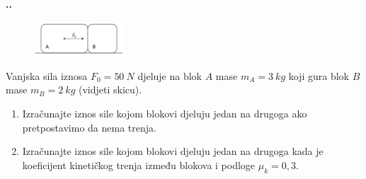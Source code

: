 

\noindent 
\textbf{
\thecjelina.\thezadatak.}
\begin{figure} %
    \centering
    \includegraphics[width=0.3\textwidth]{03_Dinamika_materijalne_tocke/zadatak_D310.png}
\end{figure}
Vanjska sila iznosa $F_0=50\ N$ djeluje na blok $A$ mase $m_A=3\ kg$  koji gura blok 
$B$ mase $m_B=2\ kg$ (vidjeti skicu). 
\begin{enumerate}[label=\alph*)]
 \item Izračunajte iznos sile kojom blokovi djeluju jedan na drugoga ako pretpostavimo da nema trenja.
 \item Izračunajte iznos sile kojom blokovi djeluju jedan na drugoga kada je koeficijent kinetičkog trenja između blokova i podloge $\mu_k =0,3$.
\end{enumerate}



